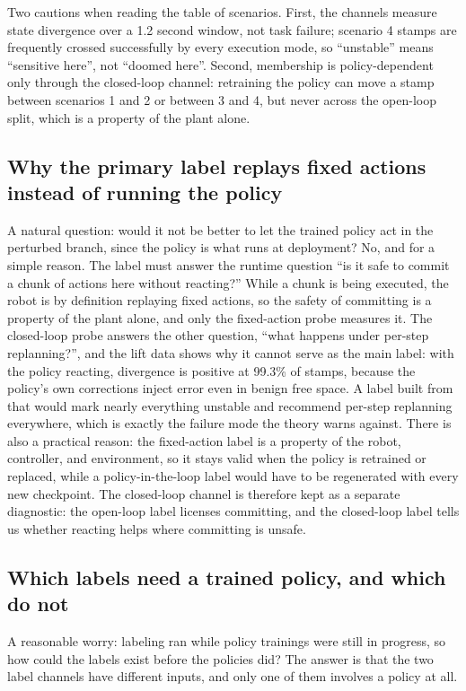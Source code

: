 \documentclass[11pt]{article}
\begin{document}
Two cautions when reading the table of scenarios. First, the channels measure
state divergence over a 1.2 second window, not task failure; scenario 4 stamps
are frequently crossed successfully by every execution mode, so ``unstable''
means ``sensitive here'', not ``doomed here''. Second, membership is
policy-dependent only through the closed-loop channel: retraining the policy can
move a stamp between scenarios 1 and 2 or between 3 and 4, but never across the
open-loop split, which is a property of the plant alone.

\subsection{Why the primary label replays fixed actions instead of running the policy}

A natural question: would it not be better to let the trained policy act in the
perturbed branch, since the policy is what runs at deployment? No, and for a simple
reason. The label must answer the runtime question ``is it safe to commit a chunk of
actions here without reacting?'' While a chunk is being executed, the robot is by
definition replaying fixed actions, so the safety of committing is a property of the
plant alone, and only the fixed-action probe measures it. The closed-loop probe
answers the other question, ``what happens under per-step replanning?'', and the lift
data shows why it cannot serve as the main label: with the policy reacting,
divergence is positive at 99.3\% of stamps, because the policy's own corrections
inject error even in benign free space. A label built from that would mark nearly
everything unstable and recommend per-step replanning everywhere, which is exactly
the failure mode the theory warns against. There is also a practical reason: the
fixed-action label is a property of the robot, controller, and environment, so it
stays valid when the policy is retrained or replaced, while a policy-in-the-loop
label would have to be regenerated with every new checkpoint. The closed-loop
channel is therefore kept as a separate diagnostic: the open-loop label licenses
committing, and the closed-loop label tells us whether reacting helps where
committing is unsafe.

\subsection{Which labels need a trained policy, and which do not}
\label{sec:policy-dependency}

A reasonable worry: labeling ran while policy trainings were still in
progress, so how could the labels exist before the policies did? The answer
is that the two label channels have different inputs, and only one of them
involves a policy at all.
\end{document}
